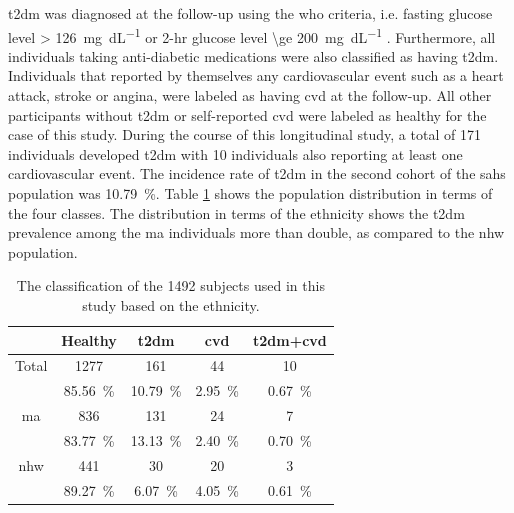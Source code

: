 \documentclass[journal,comsoc]{IEEEtran}
\renewcommand{\^}{\hat}  %
\begin{document}
\ac{t2dm} was diagnosed at the follow-up using the \ac{who} criteria, i.e. fasting glucose level \SI[round-mode = off,group-separator = {,}]{> 126}{\milli\gram\per\deci\liter} or 2-hr glucose level \SI[round-mode = off,group-separator = {,}]{\ge 200}{\milli\gram\per\deci\liter} \cite{organization_definition_2006}. Furthermore, all individuals taking anti-diabetic medications were also classified as having \ac{t2dm}. Individuals that reported by themselves any cardiovascular event such as a heart attack, stroke or angina, were labeled as having \ac{cvd} at the follow-up. All other participants without \ac{t2dm} or self-reported \ac{cvd} were labeled as healthy for the case of this study. During the course of this longitudinal study, a total of \num{171} individuals developed \ac{t2dm} with \num{10} individuals also reporting at least one cardiovascular event. The incidence rate of \ac{t2dm} in the second cohort of the \ac{sahs} population was \SI{10.79}{\percent}. Table \ref{tab:patients} shows the population distribution in terms of the four classes. The distribution in terms of the ethnicity shows the \ac{t2dm} prevalence among the \ac{ma} individuals more than double, as compared to the \ac{nhw} population.
%
\begin{table}[!b]
  \centering
  \renewcommand{\arraystretch}{1.3}
  \caption{The classification of the \num[group-minimum-digits=4, group-separator = {,}]{1492} subjects used in this study based on the ethnicity.}
  \centering
  \begin{tabular}{c c c c c}
    \toprule
    & Healthy &  \ac{t2dm} & \ac{cvd} & \ac{t2dm}+\ac{cvd}\\
    \midrule \midrule
    Total & \num[group-minimum-digits=4, group-separator = {,}]{1277} & \num{161} & \num{44} & \num{10}\\
    &\SI{85.56}{\percent} & \SI{10.79}{\percent} & \SI[round-precision=3]{2.95}{\percent} & \SI[round-precision=2]{0.67}{\percent} \\
    \midrule
    \ac{ma} & \num[group-minimum-digits=4, group-separator = {,}]{836} & \num{131} & \num{24} & \num{7}\\
    &\SI{83.77}{\percent} & \SI{13.13}{\percent} & \SI[round-precision=3]{2.40}{\percent} & \SI[round-precision=2]{0.70}{\percent} \\
    \midrule
    \ac{nhw} & \num[group-minimum-digits=4, group-separator = {,}]{441} & \num{30} & \num{20} & \num{3}\\
    &\SI{89.27}{\percent} & \SI{6.07}{\percent} & \SI[round-precision=3]{4.05}{\percent} & \SI[round-precision=2]{0.61}{\percent} \\
    \bottomrule
  \end{tabular}
  \label{tab:patients}
\end{table}
%
\end{document}
